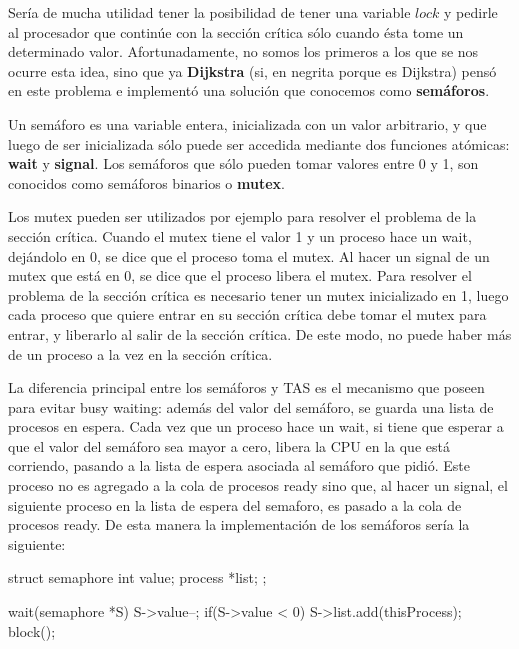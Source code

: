 \documentclass{article}
\begin{document}
Ser\'ia de mucha utilidad tener la posibilidad de tener una variable $lock$ y pedirle al procesador que contin\'ue con la secci\'on cr\'itica s\'olo cuando \'esta tome un determinado valor. Afortunadamente, no somos los primeros a los que se nos ocurre esta idea, sino que ya \textbf{Dijkstra} (si, en negrita porque es Dijkstra) pens\'o en este problema e implement\'o una soluci\'on que conocemos como \textbf{sem\'aforos}.

Un sem\'aforo es una variable entera, inicializada con un valor arbitrario, y que luego de ser inicializada s\'olo puede ser accedida mediante dos funciones atómicas: \textbf{wait} y \textbf{signal}. Los semáforos que s\'olo pueden tomar valores entre 0 y 1, son conocidos como sem\'aforos binarios o \textbf{mutex}.

Los mutex pueden ser utilizados por ejemplo para resolver el problema de la secci\'on cr\'itica. Cuando el mutex tiene el valor 1 y un proceso hace un wait, dej\'andolo en 0, se dice que el proceso toma el mutex. Al hacer un signal de un mutex que est\'a en 0, se dice que el proceso libera el mutex. Para resolver el problema de la secci\'on cr\'itica es necesario tener un mutex inicializado en 1, luego cada proceso que quiere entrar en su secci\'on cr\'itica debe tomar el mutex para entrar, y liberarlo al salir de la secci\'on cr\'itica. De este modo, no puede haber m\'as de un proceso a la vez en la secci\'on cr\'itica.

La diferencia principal entre los semáforos y TAS es el mecanismo que poseen para evitar busy waiting: adem\'as del valor del sem\'aforo, se guarda una lista de procesos en espera. Cada vez que un proceso hace un wait, si tiene que esperar a que el valor del sem\'aforo sea mayor a cero, libera la CPU en la que est\'a corriendo, pasando a la lista de espera asociada al sem\'aforo que pidi\'o. Este proceso no es agregado a la cola de procesos ready sino que, al hacer un signal, el siguiente proceso en la lista de espera del semaforo, es pasado a la cola de procesos ready. De esta manera la implementaci\'on de los sem\'aforos ser\'ia la siguiente:

\begin{code}
struct semaphore{
    int value;
		process *list;
};
\end{code}

\begin{code}
wait(semaphore *S)
{
    S->value--;
		if(S->value < 0)
		{
		    S->list.add(thisProcess);
				block();
		}
}
\end{code}
\end{document}
